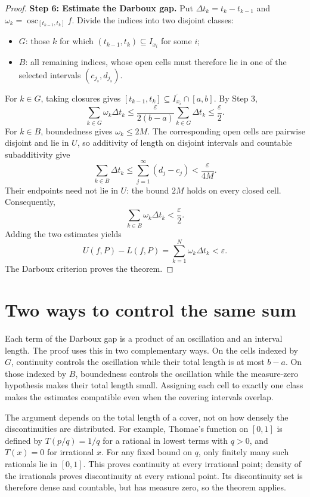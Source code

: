 \documentclass[11pt]{article}
\DeclareMathOperator{\osc}{osc}
\begin{document}
\begin{proof}
\textbf{Step 6: Estimate the Darboux gap.}
Put $\Delta t_k=t_k-t_{k-1}$ and $\omega_k=\osc_{[t_{k-1},t_k]}f$. Divide the indices into two disjoint classes:
\begin{itemize}
\item $G$: those $k$ for which $(t_{k-1},t_k)\subseteq I_{x_i}$ for some $i$;
\item $B$: all remaining indices, whose open cells must therefore lie in one of the selected intervals $(c_{j_s},d_{j_s})$.
\end{itemize}
For $k\in G$, taking closures gives $[t_{k-1},t_k]\subseteq\overline{I_{x_i}}\cap[a,b]$. By Step 3,
\[
 \sum_{k\in G}\omega_k\Delta t_k
 \leq\frac{\varepsilon}{2(b-a)}\sum_{k\in G}\Delta t_k
 \leq\frac{\varepsilon}{2}.
\]
For $k\in B$, boundedness gives $\omega_k\leq2M$. The corresponding open cells are pairwise disjoint and lie in $U$, so additivity of length on disjoint intervals and countable subadditivity give
\[
 \sum_{k\in B}\Delta t_k
 \leq\sum_{j=1}^{\infty}(d_j-c_j)<\frac{\varepsilon}{4M}.
\]
Their endpoints need not lie in $U$: the bound $2M$ holds on every closed cell. Consequently,
\[
 \sum_{k\in B}\omega_k\Delta t_k<\frac{\varepsilon}{2}.
\]
Adding the two estimates yields
\[
 U(f,P)-L(f,P)=\sum_{k=1}^{N}\omega_k\Delta t_k<\varepsilon.
\]
The Darboux criterion proves the theorem.
\end{proof}

\section{Two ways to control the same sum}
Each term of the Darboux gap is a product of an oscillation and an interval length. The proof uses this in two complementary ways. On the cells indexed by $G$, continuity controls the oscillation while their total length is at most $b-a$. On those indexed by $B$, boundedness controls the oscillation while the measure-zero hypothesis makes their total length small. Assigning each cell to exactly one class makes the estimates compatible even when the covering intervals overlap.

The argument depends on the total length of a cover, not on how densely the discontinuities are distributed. For example, Thomae's function on $[0,1]$ is defined by $T(p/q)=1/q$ for a rational in lowest terms with $q>0$, and $T(x)=0$ for irrational $x$. For any fixed bound on $q$, only finitely many such rationals lie in $[0,1]$. This proves continuity at every irrational point; density of the irrationals proves discontinuity at every rational point. Its discontinuity set is therefore dense and countable, but has measure zero, so the theorem applies.
\end{document}
